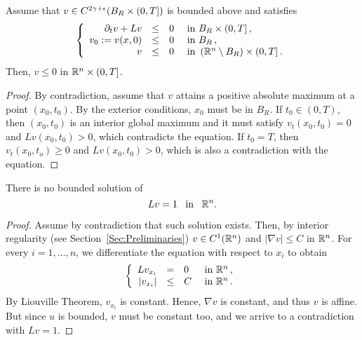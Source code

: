 \begin{theorem}
\label{Th:ParabolicmaxPrpBdd}
Assume that $v \in C^{2\gamma+\epsilon}(B_R\times(0,T])$ is bounded above and satisfies
\begin{equation*}
\left\{\begin{array}{rcll}
\partial_t v + L v &\leq& 0 & \textrm{ in }B_R\times(0,T]\,,\\
v_0:=v(x,0) &\leq& 0 & \textrm{ in } B_R\,,\\
v &\leq& 0 & \textrm{ in } \left( \mathbb{R}^n\setminus B_R\right) \times (0,T] \,.
\end{array} \right.
\end{equation*}
Then, $v\leq 0$ in $\mathbb{R}^n\times (0,T]$.
\end{theorem}

\begin{proof}
By contradiction, assume that $v$ attains a positive absolute maximum at a point $(x_0,t_0)$. By the exterior conditions, $x_0$ must be in $B_R$. If $t_0\in(0,T)$, then $(x_0,t_0)$ is an interior global maximum and it must satisfy $v_t(x_0,t_0)=0$ and $Lv(x_0,t_0)>0$, which contradicts the equation. If $t_0 = T$, then $v_t(x_0,t_o)\geq 0$ and $Lv(x_0,t_0)>0$, which is also a contradiction with the equation.
\end{proof}

\begin{lemma}
\label{Lemma:NoBddSolL=1}
There is no bounded solution of $$Lv=1 \,\,\, \text{ in } \,\,\, \mathbb{R}^n.$$
\end{lemma}

\begin{proof}
Assume by contradiction that such solution exists. Then, by interior regularity (see Section~\ref{Sec:Preliminaries}) $v\in C^1(\mathbb{R}^n)$ and $|\nabla v|\leq C$ in $\mathbb{R}^n$. For every $i = 1,\ldots, n$, we differentiate the equation with respect to $x_i$ to obtain
\begin{equation*}
\left\{\begin{array}{rcll}
L v_{x_i} &=& 0 & \textrm{ in } \mathbb{R}^n\,,\\
|v_{x_i}| &\leq& C & \textrm{ in } \mathbb{R}^n\,.
\end{array} \right.
\end{equation*}
By Liouville Theorem, $v_{x_i}$ is constant.  Hence, $\nabla v$ is constant, and thus $v$ is affine. But since $u$ is bounded, $v$ must be constant too, and we arrive to a contradiction with $Lv=1$.
\end{proof}

